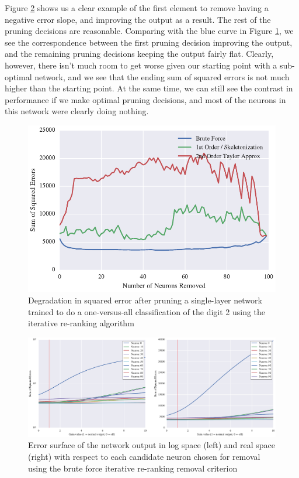 Figure \ref{fig:mnist-test-single-digit-2-gt} shows us a clear example of the first element to remove having a negative error slope, and improving the output as a result. The rest of the pruning decisions are reasonable. Comparing with the blue curve in Figure \ref{fig:mnist-test-single-digit-2}, we see the correspondence between the first pruning decision improving the output, and the remaining pruning decisions keeping the output fairly flat. Clearly, however, there isn't much room to get worse given our starting point with a sub-optimal network, and we see that the ending sum of squared errors is not much higher than the starting point. At the same time, we can still see the contrast in performance if we make optimal pruning decisions, and most of the neurons in this network were clearly doing nothing. 

\begin{figure}[!ht]
\centering
\includegraphics[width=0.5\linewidth]{mnist-test-single-digit-2.pdf}
\caption{Degradation in squared error after pruning a single-layer network trained to do a one-versus-all classification of the digit 2 using the iterative re-ranking algorithm}
\label{fig:mnist-test-single-digit-2}
\end{figure}

\begin{figure}[!ht]
\centering
\includegraphics[width=\linewidth]{mnist-test-single-digit-2-gt.pdf}
\caption{Error surface of the network output in log space (left) and real space (right) with respect to each candidate neuron chosen for removal using the brute force iterative re-ranking removal criterion}
\label{fig:mnist-test-single-digit-2-gt}
\end{figure}

